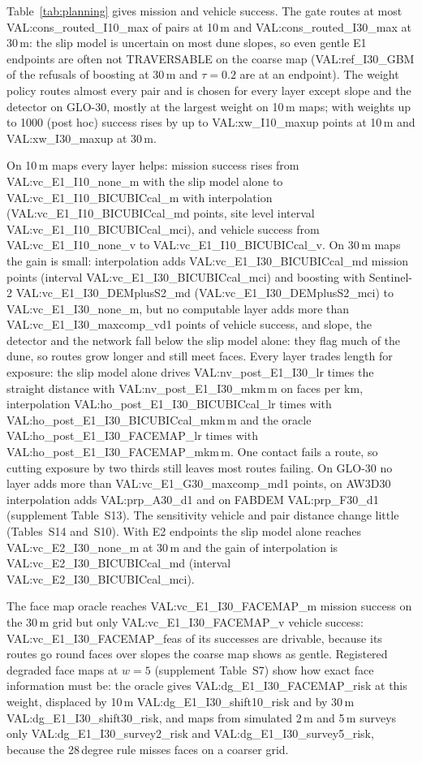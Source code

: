 Table~\ref{tab:planning} gives mission and vehicle success. The gate routes at most {{VAL:cons_routed_I10_max}} of pairs at 10\,m and {{VAL:cons_routed_I30_max}} at 30\,m: the slip model is uncertain on most dune slopes, so even gentle E1 endpoints are often not TRAVERSABLE on the coarse map ({{VAL:ref_I30_GBM}} of the refusals of boosting at 30\,m and $\tau=0.2$ are at an endpoint). The weight policy routes almost every pair and is chosen for every layer except slope and the detector on GLO-30, mostly at the largest weight on 10\,m maps; with weights up to 1000 (post hoc) success rises by up to {{VAL:xw_I10_maxup}} points at 10\,m and {{VAL:xw_I30_maxup}} at 30\,m.

On 10\,m maps every layer helps: mission success rises from {{VAL:vc_E1_I10_none_m}} with the slip model alone to {{VAL:vc_E1_I10_BICUBICcal_m}} with interpolation ({{VAL:vc_E1_I10_BICUBICcal_md}} points, site level interval {{VAL:vc_E1_I10_BICUBICcal_mci}}), and vehicle success from {{VAL:vc_E1_I10_none_v}} to {{VAL:vc_E1_I10_BICUBICcal_v}}. On 30\,m maps the gain is small: interpolation adds {{VAL:vc_E1_I30_BICUBICcal_md}} mission points (interval {{VAL:vc_E1_I30_BICUBICcal_mci}}) and boosting with Sentinel-2 {{VAL:vc_E1_I30_DEMplusS2_md}} ({{VAL:vc_E1_I30_DEMplusS2_mci}}) to {{VAL:vc_E1_I30_none_m}}, but no computable layer adds more than {{VAL:vc_E1_I30_maxcomp_vd1}} points of vehicle success, and slope, the detector and the network fall below the slip model alone: they flag much of the dune, so routes grow longer and still meet faces. Every layer trades length for exposure: the slip model alone drives {{VAL:nv_post_E1_I30_lr}} times the straight distance with {{VAL:nv_post_E1_I30_mkm}}\,m on faces per km, interpolation {{VAL:ho_post_E1_I30_BICUBICcal_lr}} times with {{VAL:ho_post_E1_I30_BICUBICcal_mkm}}\,m and the oracle {{VAL:ho_post_E1_I30_FACEMAP_lr}} times with {{VAL:ho_post_E1_I30_FACEMAP_mkm}}\,m. One contact fails a route, so cutting exposure by two thirds still leaves most routes failing. On GLO-30 no layer adds more than {{VAL:vc_E1_G30_maxcomp_md1}} points, on AW3D30 interpolation adds {{VAL:prp_A30_d1}} and on FABDEM {{VAL:prp_F30_d1}} (supplement Table~S13). The sensitivity vehicle and pair distance change little (Tables~S14 and~S10). With E2 endpoints the slip model alone reaches {{VAL:vc_E2_I30_none_m}} at 30\,m and the gain of interpolation is {{VAL:vc_E2_I30_BICUBICcal_md}} (interval {{VAL:vc_E2_I30_BICUBICcal_mci}}).

The face map oracle reaches {{VAL:vc_E1_I30_FACEMAP_m}} mission success on the 30\,m grid but only {{VAL:vc_E1_I30_FACEMAP_v}} vehicle success: {{VAL:vc_E1_I30_FACEMAP_feas}} of its successes are drivable, because its routes go round faces over slopes the coarse map shows as gentle. Registered degraded face maps at $w=5$ (supplement Table~S7) show how exact face information must be: the oracle gives {{VAL:dg_E1_I30_FACEMAP_risk}} at this weight, displaced by 10\,m {{VAL:dg_E1_I30_shift10_risk}} and by 30\,m {{VAL:dg_E1_I30_shift30_risk}}, and maps from simulated 2\,m and 5\,m surveys only {{VAL:dg_E1_I30_survey2_risk}} and {{VAL:dg_E1_I30_survey5_risk}}, because the 28\,degree rule misses faces on a coarser grid.
